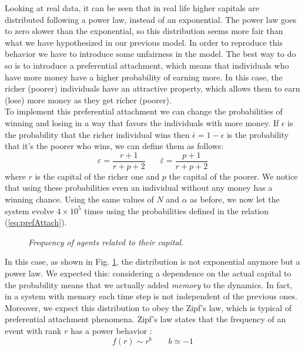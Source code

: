 Looking at real data, it can be seen that in real life higher capitals are distributed following a power law, instead of an exponential.
The power law goes to zero slower than the exponential, so this distribution seems more fair than what we have hypothesized in our previous model.
In order to reproduce this behavior we have to introduce some unfairness in the model.
The best way to do so is to introduce a preferential attachment, which means that individuals who have more money have a higher probability of earning more.
In this case, the richer (poorer) individuals have an attractive property, which allows them to earn (lose) more money as they get richer (poorer). \\
To implement this preferential attachment we can change the probabilities of winning and losing in a way that favors the individuals with more money.
If $\epsilon$ is the probability that the richer individual wins then $\bar{\epsilon} = 1 - \epsilon$ is the probability that it's the poorer who wins, we can define them as follows:
\begin{equation}
	\varepsilon = \frac{r + 1}{r + p + 2} \ \ \ \ \ \ \ \  \bar{\varepsilon} = \frac{p + 1}{r + p + 2}
	\label{eq:prefAttach}
\end{equation}
where $r$ is the capital of the richer one and $p$ the capital of the poorer.
We notice that using these probabilities even an individual without any money has a winning chance.
Using the same values of $N$ and $\alpha$ as before, we now let the system evolve $4 \times 10^5$ times using the probabilities defined in the relation (\ref{eq:prefAttach}).
\begin{figure}[ht!]
    \centering
    \scalebox{.7}{}
    \caption{\emph{Frequency of agents related to their capital.}}
    \label{fig:prefAttach}
\end{figure}
In this case, as shown in Fig. \ref{fig:prefAttach}, the distribution is not exponential anymore but a power law.
We expected this: considering a dependence on the actual capital to the probability means that we actually added \emph{memory} to the dynamics.
In fact, in a system with memory each time step is not independent of the previous ones.
\\Moreover, we expect this distribution to obey the Zipf's law, which is typical of preferential attachment phenomena.
Zipf's law states that the frequency of an event with rank $r$ has a power behavior \cite{zipf}:
\begin{equation}
    f(r) \sim r^b \ \ \ \ \ \ \ \ \ b \simeq -1
    \label{eq:zipf}
\end{equation}
